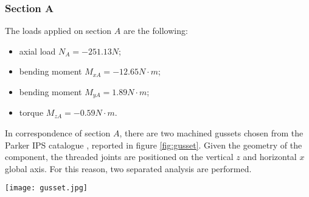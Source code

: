 \subsubsection*{Section A}
The loads applied on section $A$ are the following:\\
\begin{itemize}
	\item axial load $N_{A} = -251.13 N$;
	\item bending moment $M_{xA} = -12.65 N\cdot m$; 
	\item bending moment $M_{yA} = 1.89 N\cdot m$; 
	\item torque $M_{zA} = -0.59 N\cdot m$.
\end{itemize}
In correspondence of section $A$, there are two machined gussets chosen from the Parker IPS catalogue \cite{parker-ds}, reported in figure \ref{fig:gusset}.
Given the geometry of the component, the threaded joints are positioned on the vertical $z$ and horizontal $x$ global axis.  For this reason, two separated analysis are performed. 
\begin{SCfigure}[1.5][bht]
	\centering
	\texttt{[image: gusset.jpg]}
	\caption{machined gusset, code \texttt{10-102}, from the IPS catalogue \cite{parker-ds}. In the drawing: $A = 77mm$, $B=77mm$, $C = 34mm$, $D= 20mm$, $E=40mm$, $F=8mm$, $G=9mm$.}
	\label{fig:gusset}
\end{SCfigure}

